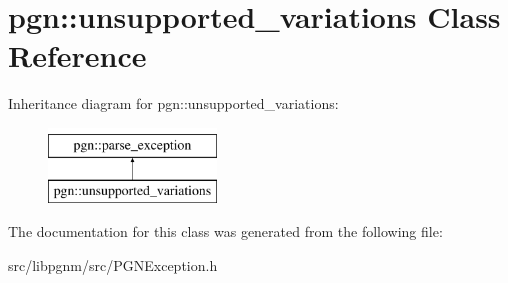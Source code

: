 \hypertarget{classpgn_1_1unsupported__variations}{
\section{pgn::unsupported\_\-variations Class Reference}
\label{classpgn_1_1unsupported__variations}
}
Inheritance diagram for pgn::unsupported\_\-variations:\begin{figure}[H]
\begin{center}
\leavevmode
\includegraphics[height=2.000000cm]{classpgn_1_1unsupported__variations}
\end{center}
\end{figure}


The documentation for this class was generated from the following file:\begin{DoxyCompactItemize}
\item 
src/libpgnm/src/PGNException.h\end{DoxyCompactItemize}
